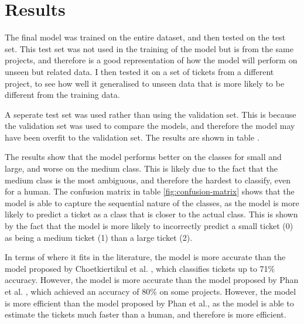 \documentclass{UoYCSproject}
\begin{document}
    \section{Results}
    The final model was trained on the entire dataset, and then tested on the test set.
    This test set was not used in the training of the model but is from the same projects, and therefore is a good representation of how the model will perform on unseen but related data.
    I then tested it on a set of tickets from a different project, to see how well it generalised to unseen data that is more likely to be different from the training data.

    A seperate test set was used rather than using the validation set. This is because the validation set was used to compare the models, and therefore the model may have been overfit to the validation set.
    The results are shown in table .

    The results show that the model performs better on the classes for small and large, and worse on the medium class.
    This is likely due to the fact that the medium class is the most ambiguous, and therefore the hardest to classify, even for a human.
    The confusion matrix in table \ref{fig:confusion-matrix} shows that the model is able to capture the sequential nature of the classes, as the model is more likely to predict a ticket as a class that is closer to the actual class.
    This is shown by the fact that the model is more likely to incorrectly predict a small ticket (0) as being a medium ticket (1) than a large ticket (2).

    In terms of where it fits in the literature, the model is more accurate than the model proposed by Choetkiertikul et al. \cite{8255666}, which classifies tickets up to 71\% accuracy. However, the model is more accurate than the model proposed by Phan et al. \cite{phan2022story}, which achieved an accuracy of 80\% on some projects. However, the model is more efficient than the model proposed by Phan et al., as the model is able to estimate the tickets much faster than a human, and therefore is more efficient.
\end{document}

